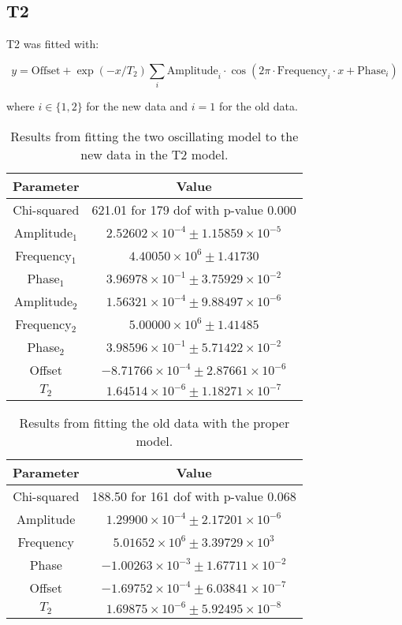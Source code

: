 \subsection{T2}
T2 was fitted with:
\begin{fullwidth}
    \begin{equation}
        y = \text{Offset} + \exp(- x / T_2) \sum_{i}  \text{Amplitude}_i \cdot \cos\left(2\pi \cdot \text{Frequency}_i\cdot x + \text{Phase}_i\right) 
    \end{equation}
\end{fullwidth}
where $i\in\{1, 2\}$ for the new data and $i = 1$ for the old data. 
\begin{table}[h]
\centering
\begin{tabular}{|c|c|}
\hline
Parameter & Value \\
\hline
Chi-squared & 621.01 for 179 dof with p-value 0.000 \\
Amplitude$_1$ & $2.52602 \times 10^{-4} \pm 1.15859 \times 10^{-5}$ \\
Frequency$_1$ & $4.40050 \times 10^6 \pm 1.41730$ \\
Phase$_1$ & $3.96978 \times 10^{-1} \pm 3.75929 \times 10^{-2}$ \\
Amplitude$_2$ & $1.56321 \times 10^{-4} \pm 9.88497 \times 10^{-6}$ \\
Frequency$_2$ & $5.00000 \times 10^6 \pm 1.41485$ \\
Phase$_2$ & $3.98596 \times 10^{-1} \pm 5.71422 \times 10^{-2}$ \\
Offset & $-8.71766 \times 10^{-4} \pm 2.87661 \times 10^{-6}$ \\
$T_2$ & $1.64514 \times 10^{-6} \pm 1.18271 \times 10^{-7}$ \\
\hline
\end{tabular}
\caption{Results from fitting the two oscillating model to the new data in the T2 model.}
\label{tab:fit_outcomes_fifth}
\end{table}

\begin{table}[h]
\centering
\begin{tabular}{|c|c|}
\hline
Parameter & Value \\
\hline
Chi-squared & 188.50 for 161 dof with p-value 0.068 \\
Amplitude & $1.29900 \times 10^{-4} \pm 2.17201 \times 10^{-6}$ \\
Frequency & $5.01652 \times 10^6 \pm 3.39729 \times 10^3$ \\
Phase & $-1.00263 \times 10^{-3} \pm 1.67711 \times 10^{-2}$ \\
Offset & $-1.69752 \times 10^{-4} \pm 6.03841 \times 10^{-7}$ \\
$T_2$ & $1.69875 \times 10^{-6} \pm 5.92495 \times 10^{-8}$ \\
\hline
\end{tabular}
\caption{Results from fitting the old data with the proper model.}
\label{tab:fit_outcomes_sixth}
\end{table}

